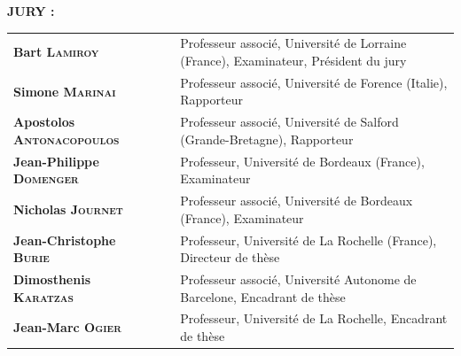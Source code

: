 \textsc{\textbf{JURY : }}  $\ $ \vspace{0.2cm} \\
\begin{tabular}{l p{1cm} p{10cm}}
  \textbf{Bart \textsc{Lamiroy}} & $\ $ &  Professeur associ{\'e}, Universit{\'e} de Lorraine (France), Examinateur, Pr{\'e}sident du jury\\
  \textbf{Simone \textsc{Marinai}} & $\ $ &  Professeur associ{\'e}, Universit{\'e} de Forence (Italie), Rapporteur\\
  \textbf{Apostolos \textsc{Antonacopoulos}} & $\ $ &  Professeur associ{\'e}, Universit{\'e} de Salford (Grande-Bretagne), Rapporteur\\
  \textbf{Jean-Philippe \textsc{Domenger}} & $\ $ &  Professeur, Universit{\'e} de Bordeaux (France), Examinateur\\
  \textbf{Nicholas \textsc{Journet}} & $\ $ &  Professeur associ{\'e}, Universit{\'e} de Bordeaux (France), Examinateur\\
  \textbf{Jean-Christophe \textsc{Burie}} & $\ $ &  Professeur, Universit{\'e} de La Rochelle (France), Directeur de th{\`e}se\\
  \textbf{Dimosthenis \textsc{Karatzas}} & $\ $ &  Professeur associ{\'e}, Universit{\'e} Autonome de Barcelone, Encadrant de th{\`e}se\\
  \textbf{Jean-Marc \textsc{Ogier}} & $\ $ &  Professeur, Universit{\'e} de La Rochelle, Encadrant de th{\`e}se\\
  
\end{tabular}


\setlength{\voffset}{0pt}
